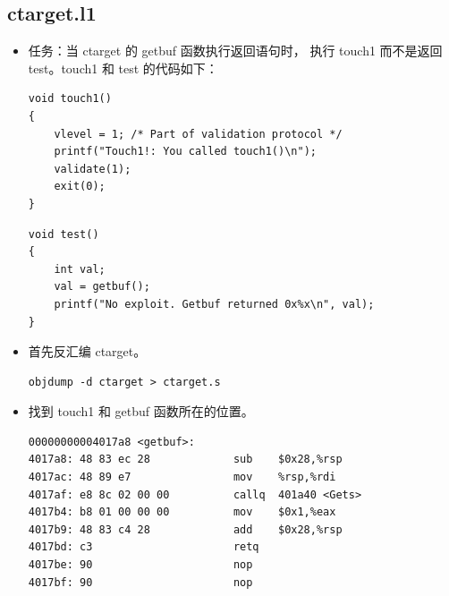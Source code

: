 \documentclass[12pt, a4paper, oneside]{ctexart}
\begin{document}
\subsection{ctarget.l1}
\begin{itemize}
    \item 任务：当 ctarget 的 getbuf 函数执行返回语句时，
    执行 touch1 而不是返回 test。touch1 和 test 的代码如下：
\begin{lstlisting}
void touch1()
{
    vlevel = 1; /* Part of validation protocol */
    printf("Touch1!: You called touch1()\n");
    validate(1);
    exit(0);
}
\end{lstlisting}
\begin{lstlisting}
void test()
{
    int val;
    val = getbuf();
    printf("No exploit. Getbuf returned 0x%x\n", val);
}
\end{lstlisting}
    \item 首先反汇编 ctarget。
\begin{lstlisting}
objdump -d ctarget > ctarget.s
\end{lstlisting}
    \item 找到 touch1 和 getbuf 函数所在的位置。
\begin{lstlisting}
00000000004017a8 <getbuf>:
4017a8:	48 83 ec 28          	sub    $0x28,%rsp
4017ac:	48 89 e7             	mov    %rsp,%rdi
4017af:	e8 8c 02 00 00       	callq  401a40 <Gets>
4017b4:	b8 01 00 00 00       	mov    $0x1,%eax
4017b9:	48 83 c4 28          	add    $0x28,%rsp
4017bd:	c3                   	retq   
4017be:	90                   	nop
4017bf:	90                   	nop


\end{lstlisting}
\end{itemize}
\end{document}

